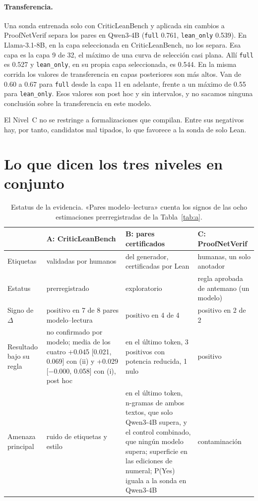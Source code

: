 \documentclass[10pt]{article}
\newcommand{\vr}[1]{\texttt{#1}}
\newcommand{\D}{\Delta}
\begin{document}
\paragraph{Transferencia.}
Una sonda entrenada solo con CriticLeanBench y aplicada sin cambios a ProofNetVerif separa los pares en Qwen3-4B
(\vr{full} 0.761, \vr{lean\_only} 0.539). En Llama-3.1-8B, en la capa seleccionada en CriticLeanBench, no los separa.
Esa capa es la capa 9 de 32, el máximo de una curva de selección casi plana. Allí \vr{full} es 0.527 y
\vr{lean\_only}, en su propia capa seleccionada, es 0.544. En la misma corrida los valores de transferencia en capas
posteriores son más altos. Van de 0.60 a 0.67 para \vr{full} desde la capa 11 en adelante, frente a un máximo de
0.55 para \vr{lean\_only}. Esos valores son post hoc y sin intervalos, y no sacamos ninguna conclusión sobre la
transferencia en este modelo.

El Nivel~C no se restringe a formalizaciones que compilan. Entre sus negativos hay, por tanto, candidatos mal
tipados, lo que favorece a la sonda de solo Lean.

\section{Lo que dicen los tres niveles en conjunto}

\begin{table}[h]
\centering
\caption{Estatus de la evidencia. «Pares modelo--lectura» cuenta los signos de las ocho estimaciones prerregistradas de la Tabla~\ref{tab:a}.}
\label{tab:conjunta}
\vspace{2pt}
\begin{tabularx}{\linewidth}{@{}lXXX@{}}
\toprule
 & A: CriticLeanBench & B: pares certificados & C: ProofNetVerif\\
\midrule
Etiquetas & validadas por humanos & del generador, certificadas por Lean & humanas, un solo anotador\\
Estatus & prerregistrado & exploratorio & regla aprobada de antemano (un modelo)\\
Signo de $\D$ & positivo en 7 de 8 pares modelo--lectura & positivo en 4 de 4 & positivo en 2 de 2\\
Resultado bajo su regla & no confirmado por modelo; media de los cuatro +0.045 [0.021, 0.069] con (ii) y +0.029 [−0.000, 0.058] con (i), post hoc & en el último token, 3 positivos con potencia reducida, 1 nulo & positivo\\
Amenaza principal & ruido de etiquetas y estilo & en el último token, n-gramas de ambos textos, que solo Qwen3-4B supera, y el control combinado, que ningún modelo supera; superficie en las ediciones de numeral; P(Yes) iguala a la sonda en Qwen3-4B & contaminación\\
\bottomrule
\end{tabularx}
\end{table}
\end{document}
